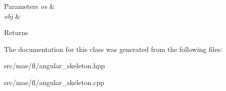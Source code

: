 \begin{DoxyParams}{Parameters}
{\em os} & \\
\hline
{\em obj} & \\
\hline
\end{DoxyParams}
\begin{DoxyReturn}{Returns}

\end{DoxyReturn}


The documentation for this class was generated from the following files\-:\begin{DoxyCompactItemize}
\item 
src/mae/fl/angular\-\_\-skeleton.\-hpp\item 
src/mae/fl/angular\-\_\-skeleton.\-cpp\end{DoxyCompactItemize}
